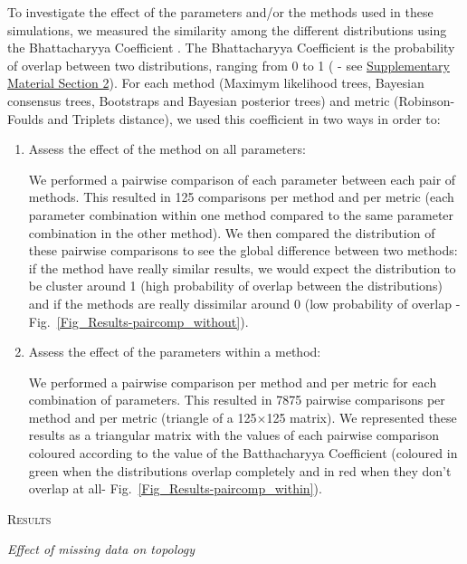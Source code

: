 \documentclass[12pt,letterpaper]{article}
\renewcommand{\section}[1]{%
\bigskip
\begin{center}
\begin{Large}
\normalfont\scshape #1
\medskip
\end{Large}
\end{center}}
\renewcommand{\subsection}[1]{%
\bigskip
\begin{center}
\begin{large}
\normalfont\itshape #1
\end{large}
\end{center}}
\begin{document}
To investigate the effect of the parameters and/or the methods used in these simulations, we measured the similarity among the different distributions using the Bhattacharyya Coefficient \citep{Bhattacharyya}. The Bhattacharyya Coefficient is the probability of overlap between two distributions, ranging from 0 to 1 (\citealt{Bhattacharyya} - see \hyperref[SupplementaryMaterial]{Supplementary Material Section 2}). For each method (Maximym likelihood trees, Bayesian consensus trees, Bootstraps and Bayesian posterior trees) and metric (Robinson-Foulds and Triplets distance), we used this coefficient in two ways in order to:
\begin{enumerate}
\item{Assess the effect of the method on all parameters:}

We performed a pairwise comparison of each parameter between each pair of methods. This resulted in 125 comparisons per method and per metric (each parameter combination within one method compared to the same parameter combination in the other method). We then compared the distribution of these pairwise comparisons to see the global difference between two methods: if the method have really similar results, we would expect the distribution to be cluster around 1 (high probability of overlap between the distributions) and if the methods are really dissimilar around 0 (low probability of overlap - Fig.~\ref{Fig_Results-paircomp_without}).
\item{Assess the effect of the parameters within a method:}

We performed a pairwise comparison per method and per metric for each combination of parameters. This resulted in 7875 pairwise comparisons per method and per metric (triangle of a 125$\times$125 matrix). We represented these results as a triangular matrix with the values of each pairwise comparison coloured according to the value of the Batthacharyya Coefficient (coloured in green when the distributions overlap completely and in red when they don't overlap at all- Fig.~\ref{Fig_Results-paircomp_within}).
\end{enumerate}

%
%

\section{Results}

\subsection{Effect of missing data on topology}
\end{document}
